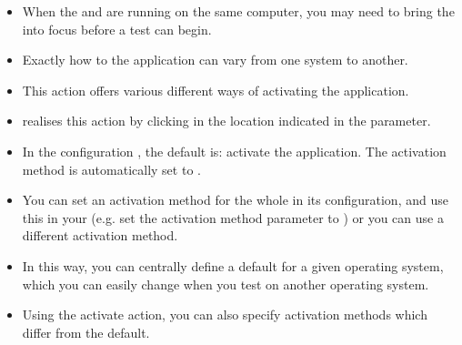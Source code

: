 \label{activate}
\begin{itemize}
\item When the \ite{} and \gdagent{} are running on the same computer, you may need to bring the \gdaut{} into focus before a test can begin.
\item Exactly how to  the application can vary from one system to another.
\item This action offers various different ways of activating the application.
\item \app{} realises this action by clicking in the location indicated in the  parameter.
\item In the \gdaut{} configuration , the default is:
activate the application. The activation method is automatically set to .
\item You can set an activation method for the whole \gdaut{} in  its configuration, and use this in your \gdsteps{} (e.g. set the activation method parameter to ) or you can use a different activation method.
\item In this way, you can centrally define a default for a given operating system, which you can easily change when you test on another operating system.
\item Using the activate action, you can also specify activation methods which differ from the default.

 
\end{itemize}



  
